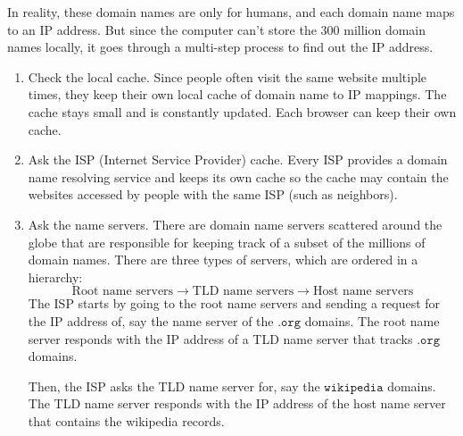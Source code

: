 \documentclass{article}
\begin{document}
  In reality, these domain names are only for humans, and each domain name maps to an IP address. But since the computer can't store the 300 million domain names locally, it goes through a multi-step process to find out the IP address. 

  \begin{enumerate}
      \item Check the local cache. Since people often visit the same website multiple times, they keep their own local cache of domain name to IP mappings. The cache stays small and is constantly updated. Each browser can keep their own cache. 
      \item Ask the ISP (Internet Service Provider) cache. Every ISP provides a domain name resolving service and keeps its own cache so the cache may contain the websites accessed by people with the same ISP (such as neighbors).  
      \item Ask the name servers. There are domain name servers scattered around the globe that are responsible for keeping track of a subset of the millions of domain names. There are three types of servers, which are ordered in a hierarchy: 
      \[\text{Root name servers} \rightarrow \text{TLD name servers} \rightarrow \text{Host name servers}\]
      The ISP starts by going to the root name servers and sending a request for the IP address of, say the name server of the $\texttt{.org}$ domains. The root name server responds with the IP address of a TLD name server that tracks $\texttt{.org}$ domains. 
      \begin{center}
      \end{center}
      Then, the ISP asks the TLD name server for, say the $\texttt{wikipedia}$ domains. The TLD name server responds with the IP address of the host name server that contains the wikipedia records.
      \begin{center}
\end{center}
\end{enumerate}
\end{document}
